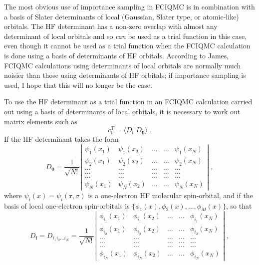 \documentclass{article}
\newcommand{\bi}{\boldsymbol{i}}
\newcommand{\bzero}{\boldsymbol{0}}
\newcommand{\br}{\boldsymbol{r}}
\begin{document}
The most obvious use of importance sampling in FCIQMC is in
combination with a basis of Slater determinants of local (Gaussian,
Slater type, or atomic-like) orbitals. The HF determinant has a
non-zero overlap with almost any determinant of local orbitals and so
\emph{can} be used as a trial function in this case, even though it
cannot be used as a trial function when the FCIQMC calculation is done
using a basis of determinants of HF orbitals.  According to James,
FCIQMC calculations using determinants of local orbitals are normally
much noisier than those using determinants of HF orbitals; if
importance sampling is used, I hope that this will no longer be the
case.

To use the HF determinant as a trial function in an FCIQMC calculation
carried out using a basis of determinants of local orbitals, it is
necessary to work out matrix elements such as
\begin{displaymath}
  c_{\bi}^{T} = \langle D_{\bi} | D_{\bzero} \rangle \;.
\end{displaymath}
If the HF determinant takes the form
\begin{displaymath}
D_{\bzero} = \frac{1}{\sqrt{N!}}  \left | \begin{array}{ccccc}
\psi_{1}(x_1) & \psi_{1}(x_2) & \ldots & \ldots & \psi_{1}(x_N) \\
\psi_{2}(x_1) & \psi_{2}(x_2) & \ldots & \ldots & \psi_{2}(x_N) \\
\ldots & \ldots & \ldots & \ldots & \ldots \\ \ldots & \ldots & \ldots
& \ldots & \ldots \\ \ldots & \ldots & \ldots & \ldots & \ldots \\
\psi_{N}(x_1) & \psi_{N}(x_2) & \ldots & \ldots & \psi_{N}(x_N)
\end{array} \right | \;,
\end{displaymath}
where $\psi_i(x) = \psi_i(\br,\sigma)$ is a one-electron HF molecular
spin-orbital, and if the basis of local one-electron spin-orbitals is
$\{\phi_1(x), \phi_2(x), \ldots, \phi_M(x)\}$, so that
\begin{displaymath}
D_{\bi} = D_{i_1 i_2\ldots i_N} = \frac{1}{\sqrt{N!}}
\left | \begin{array}{ccccc}
\phi_{i_1}(x_1) & \phi_{i_1}(x_2) & \ldots & \ldots & \phi_{i_1}(x_N) \\
\phi_{i_2}(x_1) & \phi_{i_2}(x_2) & \ldots & \ldots & \phi_{i_2}(x_N) \\
\ldots & \ldots & \ldots & \ldots & \ldots \\
\ldots & \ldots & \ldots & \ldots & \ldots \\
\ldots & \ldots & \ldots & \ldots & \ldots \\
\phi_{i_N}(x_1) & \phi_{i_N}(x_2) & \ldots & \ldots & \phi_{i_N}(x_N)
\end{array} \right |\;,
\end{displaymath}
\end{document}
